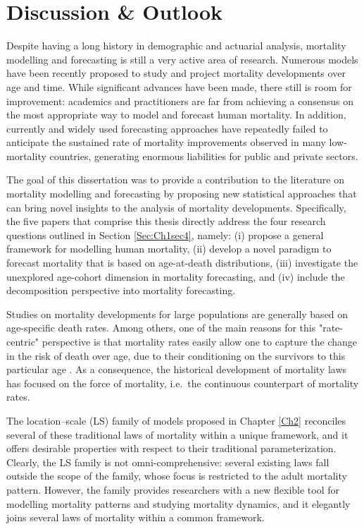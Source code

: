 \documentclass[Thesis]{subfiles}
\begin{document}
\section{Discussion \& Outlook}\label{Sec:Ch1sec10}
Despite having a long history in demographic and actuarial analysis, mortality modelling and forecasting is still a very active area of research. Numerous models have been recently proposed to study and project mortality developments over age and time. While significant advances have been made, there still is room for improvement: academics and practitioners are far from achieving a consensus on the most appropriate way to model and forecast human mortality. In addition, currently and widely used forecasting approaches have repeatedly failed to anticipate the sustained rate of mortality improvements observed in many low-mortality countries, generating enormous liabilities for public and private sectors.

The goal of this dissertation was to provide a contribution to the literature on mortality modelling and forecasting by proposing new statistical approaches that can bring novel insights to the analysis of mortality developments. Specifically, the five papers that comprise this thesis directly address the four research questions outlined in Section \ref{Sec:Ch1sec4}, namely: (i) propose a general framework for modelling human mortality, (ii) develop a novel paradigm to forecast mortality that is based on age-at-death distributions, (iii) investigate the unexplored age-cohort dimension in mortality forecasting, and (iv) include the decomposition perspective into mortality forecasting.  

Studies on mortality developments for large populations are generally based on age-specific death rates. Among others, one of the main reasons for this "rate-centric" perspective is that mortality rates easily allow one to capture the change in the risk of death over age, due to their conditioning on the survivors to this particular age \citep{camarda2008smoothing}. As a consequence, the historical development of mortality laws has focused on the force of mortality, i.e.~the continuous counterpart of mortality rates. 

The location--scale (LS) family of models proposed in Chapter \ref{Ch2} reconciles several of these traditional laws of mortality within a unique framework, and it offers desirable properties with respect to their traditional parameterization. Clearly, the LS family is not omni-comprehensive: several existing laws fall outside the scope of the family, whose focus is restricted to the adult mortality pattern. However, the family provides researchers with a new flexible tool for modelling mortality patterns and studying mortality dynamics, and it elegantly joins several laws of mortality within a common framework.
\end{document}
